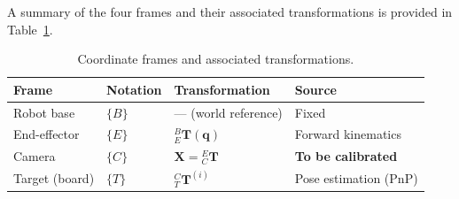 A summary of the four frames and their associated transformations is provided
in Table~\ref{tab:frames_summary}.

\begin{table}[h]
    \centering
    \caption{Coordinate frames and associated transformations.}
    \label{tab:frames_summary}
    \begin{tabular}{llll}
        \toprule
        \textbf{Frame} & \textbf{Notation} & \textbf{Transformation} &
        \textbf{Source} \\
        \midrule
        Robot base      & $\{B\}$ & — (world reference)           & Fixed \\
        End-effector    & $\{E\}$ & ${}^B_E\mathbf{T}(\mathbf{q})$
                                  & Forward kinematics \\
        Camera          & $\{C\}$ & $\mathbf{X} = {}^E_C\mathbf{T}$
                                  & \textbf{To be calibrated} \\
        Target (board)  & $\{T\}$ & ${}^C_T\mathbf{T}^{(i)}$
                                  & Pose estimation (PnP) \\
        \bottomrule
    \end{tabular}
\end{table}


